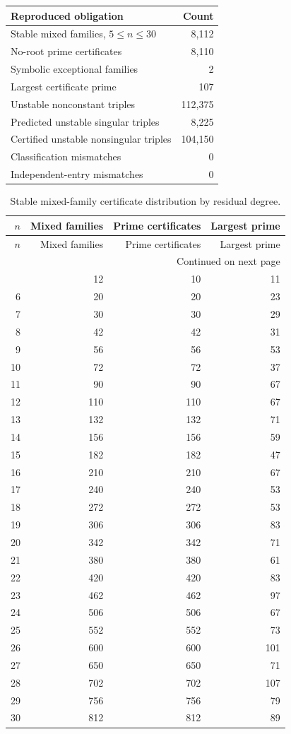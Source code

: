 \begin{center}
\small
\begin{tabular}{@{}lr@{}}
\toprule
Reproduced obligation & Count \\
\midrule
Stable mixed families, $5\le n\le30$ & 8{,}112\\
No-root prime certificates & 8{,}110\\
Symbolic exceptional families & 2\\
Largest certificate prime & 107\\
Unstable nonconstant triples & 112{,}375\\
Predicted unstable singular triples & 8{,}225\\
Certified unstable nonsingular triples & 104{,}150\\
Classification mismatches & 0\\
Independent-entry mismatches & 0\\
\bottomrule
\end{tabular}
\end{center}

\begin{longtable}{@{}rrrr@{}}
\caption{Stable mixed-family certificate distribution by residual degree.}\label{tab:certificate-distribution}\\
\toprule
$n$ & Mixed families & Prime certificates & Largest prime\\
\midrule
\endfirsthead
\toprule
$n$ & Mixed families & Prime certificates & Largest prime\\
\midrule
\endhead
\midrule
\multicolumn{4}{r}{Continued on next page}\\
\endfoot
\bottomrule
\endlastfoot
5 & 12 & 10 & 11\\
6 & 20 & 20 & 23\\
7 & 30 & 30 & 29\\
8 & 42 & 42 & 31\\
9 & 56 & 56 & 53\\
10 & 72 & 72 & 37\\
11 & 90 & 90 & 67\\
12 & 110 & 110 & 67\\
13 & 132 & 132 & 71\\
14 & 156 & 156 & 59\\
15 & 182 & 182 & 47\\
16 & 210 & 210 & 67\\
17 & 240 & 240 & 53\\
18 & 272 & 272 & 53\\
19 & 306 & 306 & 83\\
20 & 342 & 342 & 71\\
21 & 380 & 380 & 61\\
22 & 420 & 420 & 83\\
23 & 462 & 462 & 97\\
24 & 506 & 506 & 67\\
25 & 552 & 552 & 73\\
26 & 600 & 600 & 101\\
27 & 650 & 650 & 71\\
28 & 702 & 702 & 107\\
29 & 756 & 756 & 79\\
30 & 812 & 812 & 89\\
\end{longtable}
